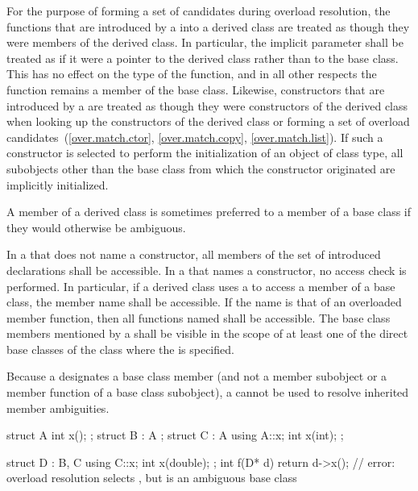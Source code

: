 \pnum
{}%
For the purpose of forming a set of candidates during overload resolution,
the functions that are
introduced by a  into a derived class
are treated as though they were members of the derived class. In
particular, the implicit  parameter shall be treated as if
it were a pointer to the derived class rather than to the base class.
This has no effect on the type of the function, and in all other
respects the function remains a member of the base class.
Likewise, constructors that are introduced by a 
are treated as though they were constructors of the derived class
when looking up the constructors of the derived class
or forming a set of overload candidates~(\ref{over.match.ctor}, \ref{over.match.copy}, \ref{over.match.list}).
If such a constructor is selected to perform the initialization
of an object of class type, all subobjects other than the base class
from which the constructor originated
are implicitly initialized.
\begin{note}
A member of a derived class is sometimes preferred to a member of a base class
if they would otherwise be ambiguous.
\end{note}

\pnum
{}%
In a  that does not name a constructor,
all members of the set of introduced declarations shall be accessible.
In a  that names a constructor,
no access check is performed.
In particular, if a derived class uses a
 to access a member of a base class, the
member name shall be accessible. If the name is that of an overloaded
member function, then all functions named shall be accessible. The base
class members mentioned by a  shall be
visible in the scope of at least one of the direct base classes of the
class where the  is specified.

\pnum
\begin{note}
Because a  designates a base class member
(and not a member subobject or a member function of a base class
subobject), a  cannot be used to resolve
inherited member ambiguities.
\begin{example}
\begin{codeblock}
struct A { int x(); };
struct B : A { };
struct C : A {
  using A::x;
  int x(int);
};

struct D : B, C {
  using C::x;
  int x(double);
};
int f(D* d) {
  return d->x();    // error: overload resolution selects , but  is an ambiguous base class
}
\end{codeblock}
\end{example}
\end{note}

